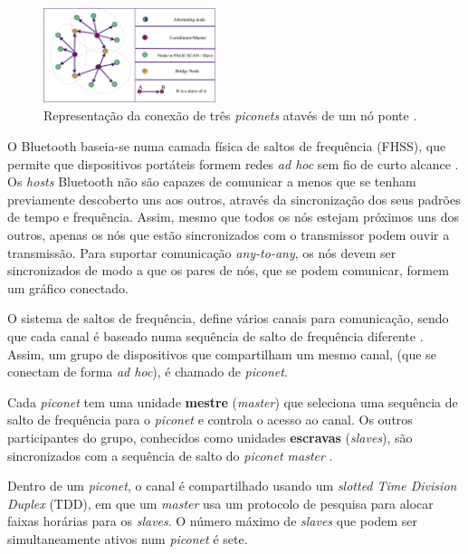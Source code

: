 \documentclass[conference]{IEEEtran}
\begin{document}
\begin{figure}[!t]
  \centering
  \includegraphics[width=0.45\textwidth]{no_ponte.png}
  \caption{Representação da conexão de três \textit{piconets} atavés de um nó ponte \cite{salonidis2005distributed}.}
  \label{fig:noPonte}
\end{figure}

O Bluetooth baseia-se numa camada física de saltos de frequência (FHSS), que permite que dispositivos portáteis formem redes \textit{ad hoc} sem fio de curto alcance \cite{salonidis2005distributed}. 
Os \textit{hosts} Bluetooth não são capazes de comunicar a menos que se tenham previamente descoberto uns aos outros, através da sincronização dos seus padrões de tempo e frequência. 
Assim, mesmo que todos os nós estejam próximos uns dos outros, apenas os nós que estão sincronizados com o transmissor podem ouvir a transmissão.
Para suportar comunicação \textit{any-to-any}, os nós devem ser sincronizados de modo a que os pares de nós, que se podem comunicar, formem um gráfico conectado.

O sistema de saltos de frequência, define vários canais para comunicação, sendo que cada canal é baseado numa sequência de salto de frequência diferente \cite{salonidis2005distributed}. 
Assim, um grupo de dispositivos que compartilham um mesmo canal, (que se conectam de forma \textit{ad hoc}), é chamado de \textit{piconet}. 

Cada \textit{piconet} tem uma unidade \textbf{mestre} (\textit{master}) que seleciona uma sequência de salto de frequência para o \textit{piconet} e controla o acesso ao canal. 
Os outros participantes do grupo, conhecidos como unidades \textbf{escravas} (\textit{slaves}), são sincronizados com a sequência de salto do \textit{piconet master} \cite{salonidis2005distributed}. 

Dentro de um \textit{piconet}, o canal é compartilhado usando um \textit{slotted Time Division Duplex} (TDD), em que um \textit{master} usa um protocolo de pesquisa para alocar faixas horárias para os \textit{slaves}. O número máximo de \textit{slaves} que podem ser simultaneamente ativos num \textit{piconet} é sete.
\end{document}
